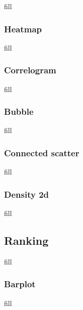 \documentclass[
  b5paper]{book}
\begin{document}
fill

\hypertarget{heatmap}{%
\subsubsection*{Heatmap}\label{heatmap}}

fill

\hypertarget{correlogram}{%
\subsubsection*{Correlogram}\label{correlogram}}

fill

\hypertarget{bubble}{%
\subsubsection*{Bubble}\label{bubble}}

fill

\hypertarget{connected-scatter}{%
\subsubsection*{Connected scatter}\label{connected-scatter}}

fill

\hypertarget{density-2d}{%
\subsubsection*{Density 2d}\label{density-2d}}

fill

\hypertarget{ranking}{%
\subsection*{Ranking}\label{ranking}}

fill

\hypertarget{barplot}{%
\subsubsection*{Barplot}\label{barplot}}

fill
\end{document}
